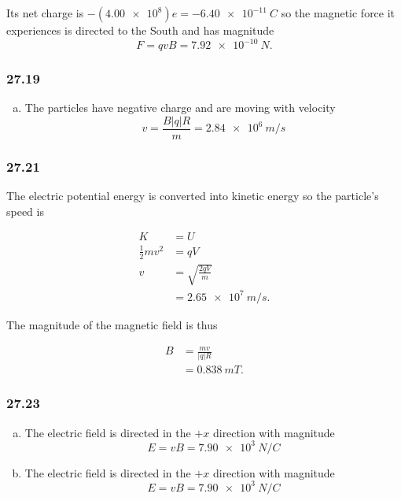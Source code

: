 \documentclass{article}
\begin{document}
Its net charge is $-(\num{4.00e8}) e = \qty{-6.40e-11}{C}$ so the magnetic force it experiences is directed to the South and has magnitude \[F = q v B = \qty{7.92e-10}{N}.\]

\subsubsection{27.19}

\begin{enumerate}[(a)]
  \item The particles have negative charge and are moving with velocity \[v = \frac{B |q| R}{m} = \qty{2.84e6}{m/s}\]
\end{enumerate}

\subsubsection{27.21}

The electric potential energy is converted into kinetic energy so the particle's speed is

\begin{align*}
  K                 & = U                      \\
  \frac{1}{2} m v^2 & = q V                    \\
  v                 & = \sqrt{\frac{2 q V}{m}} \\
                    & = \qty{2.65e7}{m/s}.
\end{align*}

The magnitude of the magnetic field is thus

\begin{align*}
  B & = \frac{m v}{|q| R} \\
    & = \qty{0.838}{mT}.
\end{align*}

\subsubsection{27.23}

\begin{enumerate}[(a)]
  \item The electric field is directed in the $+x$ direction with magnitude \[E = v B = \qty{7.90e3}{N/C}\]

  \item The electric field is directed in the $+x$ direction with magnitude \[E = v B = \qty{7.90e3}{N/C}\]
\end{enumerate}
\end{document}
